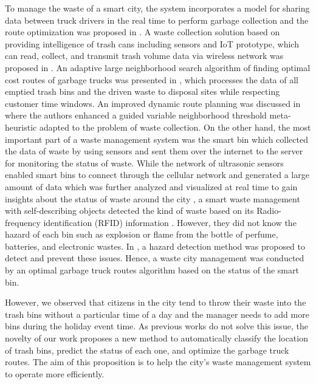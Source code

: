 \documentclass[conference]{IEEEtran}
\begin{document}
\par To manage the waste of a smart city, the system incorporates a model for sharing data between truck drivers in the real time to perform garbage collection and the route optimization was proposed in \cite{Medvedev2015}. A waste collection solution based on providing intelligence of trash cans including sensors and IoT prototype, which can read, collect, and transmit trash volume data via wireless network was proposed in \cite{Gutierreza2015}\cite{Hong2014}. An adaptive large neighborhood search algorithm of finding optimal cost routes of garbage trucks was presented in \cite{Buhrkala212}, which processes the data of all emptied trash bins and the driven waste to disposal sites while respecting customer time windows. An improved dynamic route planning was discussed in \cite{Nuorito2006} where the authors enhanced a guided variable neighborhood threshold meta-heuristic adapted to the problem of waste collection. On the other hand, the most important part of a waste management system was the smart bin \cite{Sharma2015}\cite{Glouche2013}\cite{Sinhan2013} which collected the data of waste by using sensors and sent them over the internet to the server for monitoring the status of waste. While the network of ultrasonic sensors enabled smart bins to connect through the cellular network and generated a large amount of data which was further analyzed and visualized at real time to gain insights about the status of waste around the city \cite{Sharma2015}, a smart waste management with self-describing objects detected the kind of waste based on its Radio-frequency identification (RFID) information \cite{Glouche2013}. However, they did not know the hazard of each bin such as explosion or flame from the bottle of perfume, batteries, and electronic wastes. In \cite{Sinhan2013}, a hazard detection method was proposed to detect and prevent these issues. Hence, a waste city management was conducted by an optimal garbage truck routes algorithm based on the status of the smart bin. 

However, we observed that citizens in the city tend to throw their waste into the trash bins without a particular time of a day and the manager needs to add more bins during the holiday event time. As previous works do not solve this issue, the novelty of our work proposes a new method to automatically classify the location of trash bins, predict the status of each one, and optimize the garbage truck routes. The aim of this proposition is to help the city’s waste management system to operate more efficiently. 
\end{document}
